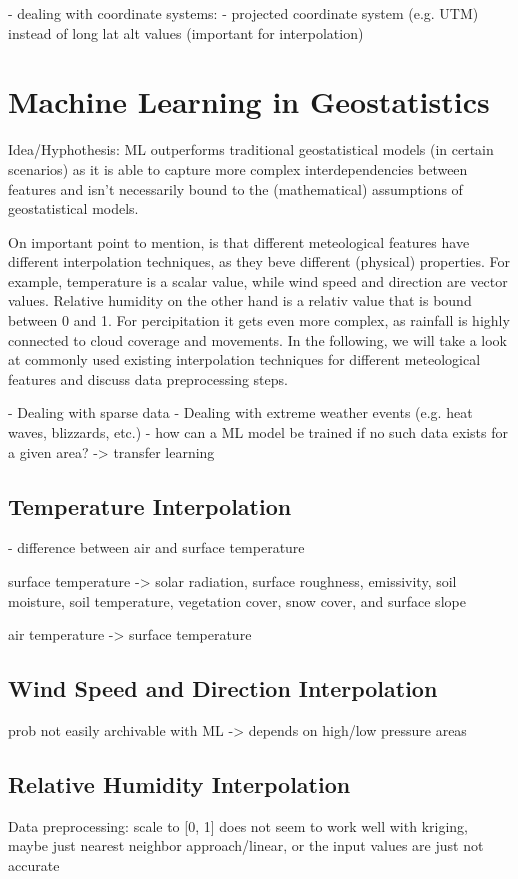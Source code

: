 - dealing with coordinate systems:
    - projected coordinate system (e.g. UTM) instead of long lat alt values (important for interpolation)

\section{Machine Learning in Geostatistics}

Idea/Hyphothesis: ML outperforms traditional geostatistical models (in certain scenarios) as it is able to capture more complex interdependencies between features and isn't necessarily bound to the (mathematical) assumptions of geostatistical models.

On important point to mention, is that different meteological features have different interpolation techniques, as they beve different (physical) properties. For example, temperature is a scalar value, while wind speed and direction are vector values. Relative humidity on the other hand is a relativ value that is bound between 0 and 1. For percipitation it gets even more complex, as rainfall is highly connected to cloud coverage and movements. In the following, we will take a look at commonly used existing interpolation techniques for different meteological features and discuss data preprocessing steps.

- Dealing with sparse data
- Dealing with extreme weather events (e.g. heat waves, blizzards, etc.)
- how can a ML model be trained if no such data exists for a given area? -> transfer learning

\subsection{Temperature Interpolation}
- difference between air and surface temperature

surface temperature -> solar radiation, surface roughness, emissivity, soil moisture, soil temperature, vegetation cover, snow cover, and surface slope

air temperature -> surface temperature

\subsection{Wind Speed and Direction Interpolation}
prob not easily archivable with ML -> depends on high/low pressure areas

\subsection{Relative Humidity Interpolation}
Data preprocessing: scale to [0, 1]
does not seem to work well with kriging, maybe just nearest neighbor approach/linear, or the input values are just not accurate

